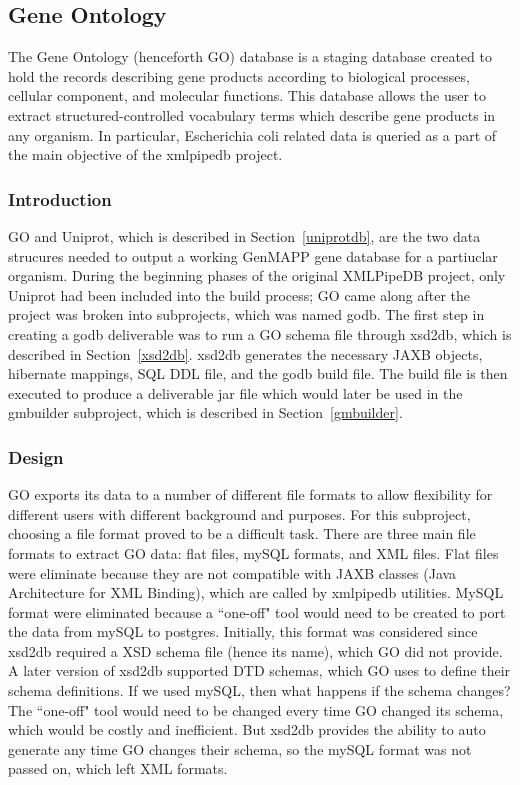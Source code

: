 %


\subsection{Gene Ontology}
The Gene Ontology (henceforth GO) database is a staging database created to hold the records describing gene products according to biological processes,
cellular component, and molecular functions. This database allows the user to extract structured-controlled vocabulary terms
which describe gene products in any organism. In particular, Escherichia coli related data is queried as a part of the main
objective of the xmlpipedb project.

\subsubsection{Introduction}
GO and Uniprot, which is described in Section~\ref{uniprotdb}, are the two data strucures needed to output a
working GenMAPP gene database for a partiuclar organism. During the beginning phases of the original XMLPipeDB project,
only Uniprot had been included into the build process; GO came along after the project was broken into subprojects,
which was named godb. The first step in creating a godb deliverable was to run a GO schema file
through xsd2db, which is described in Section~\ref{xsd2db}. xsd2db generates the necessary JAXB
objects, hibernate mappings, SQL DDL file, and the godb build file. The build file is then executed
to produce a deliverable jar file which  would later be used in the gmbuilder
subproject, which is described in Section~\ref{gmbuilder}.


\subsubsection{Design}
\label{godtd}
GO exports its data to a number of different file formats to allow flexibility for different users with
different background and purposes. For this subproject, choosing a file format proved to be a difficult task.
There are three main file formats to extract GO data: flat files, mySQL formats, and XML files. Flat files
were eliminate because they are not compatible with JAXB classes (Java Architecture for XML Binding), which  are called by
xmlpipedb utilities. MySQL format were eliminated because a ``one-off" tool would need
to be created to port the data from mySQL to postgres. Initially, this format was considered since xsd2db
required a XSD
schema file (hence its name), which GO did not provide. A later version of xsd2db supported DTD schemas, which GO uses to define their
schema definitions. If we used mySQL, then what happens if the schema changes? The ``one-off" tool would need to be changed every
time GO changed its schema, which would be costly and inefficient. But xsd2db provides the ability to auto generate any time GO changes
their schema, so the mySQL format was not passed on, which left XML formats.

